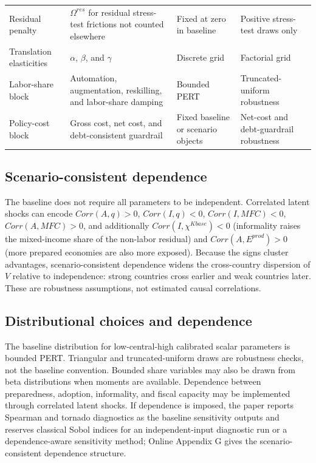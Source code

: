 \documentclass[11pt,a4paper]{article}
\begin{document}
\begin{footnotesize}
\begin{longtable}{>{\raggedright\arraybackslash}p{}>{\raggedright\arraybackslash}p{}>{\raggedright\arraybackslash}p{}>{\raggedright\arraybackslash}p{}}
Residual penalty & $\Omega^{res}$ for residual stress-test frictions not counted elsewhere & Fixed at zero in baseline & Positive stress-test draws only \\
Translation elasticities & $\alpha$, $\beta$, and $\gamma$ & Discrete grid & Factorial grid \\
Labor-share block & Automation, augmentation, reskilling, and labor-share damping & Bounded PERT & Truncated-uniform robustness \\
Policy-cost block & Gross cost, net cost, and debt-consistent guardrail & Fixed baseline or scenario objects & Net-cost and debt-guardrail robustness \\
\bottomrule
\end{longtable}
\end{footnotesize}

\subsection{Scenario-consistent dependence}

The baseline does not require all parameters to be independent. Correlated latent shocks can encode $Corr(A,q)>0$, $Corr(I,q)<0$, $Corr(I,MFC)<0$, $Corr(A,MFC)>0$, and additionally $Corr(I,\chi^{Kbase})<0$ (informality raises the mixed-income share of the non-labor residual) and $Corr(A,E^{prod})>0$ (more prepared economies are also more exposed). Because the signs cluster advantages, scenario-consistent dependence widens the cross-country dispersion of $V$ relative to independence: strong countries cross earlier and weak countries later. These are robustness assumptions, not estimated causal correlations.

\subsection{Distributional choices and dependence}

The baseline distribution for low-central-high calibrated scalar parameters is bounded PERT. Triangular and truncated-uniform draws are robustness checks, not the baseline convention. Bounded share variables may also be drawn from beta distributions when moments are available. Dependence between preparedness, adoption, informality, and fiscal capacity may be implemented through correlated latent shocks. If dependence is imposed, the paper reports Spearman and tornado diagnostics as the baseline sensitivity outputs and reserves classical Sobol indices for an independent-input diagnostic run or a dependence-aware sensitivity method; Online Appendix G gives the scenario-consistent dependence structure.
\end{document}
